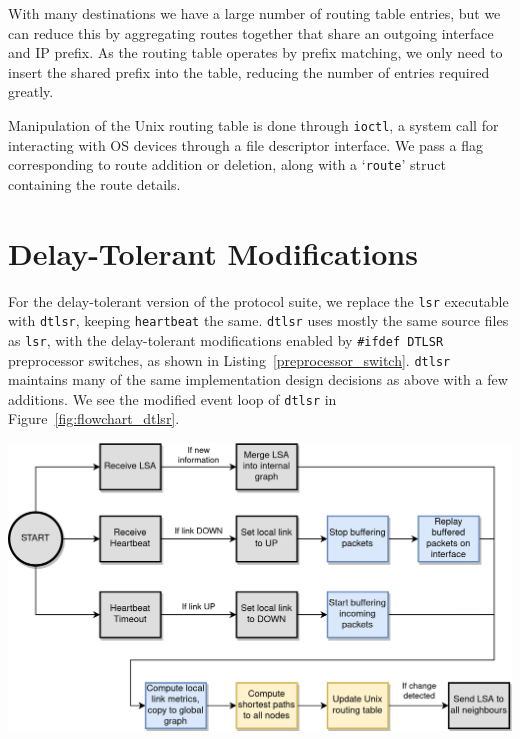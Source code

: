 \documentclass[withindex,glossary,openany]{cam-thesis}
\begin{document}
With many destinations we have a large number of routing table entries, but we can reduce this by aggregating routes together that share an outgoing interface and IP prefix. As the routing table operates by prefix matching, we only need to insert the shared prefix into the table, reducing the number of entries required greatly.

Manipulation of the Unix routing table is done through \texttt{ioctl}, a system call for interacting with OS devices through a file descriptor interface. We pass a flag corresponding to route addition or deletion, along with a `\texttt{route}' struct containing the route details.

\section{Delay-Tolerant Modifications}

For the delay-tolerant version of the protocol suite, we replace the \texttt{lsr} executable with \texttt{dtlsr}, keeping \texttt{heartbeat} the same. \texttt{dtlsr} uses mostly the same source files as \texttt{lsr}, with the delay-tolerant modifications enabled by \texttt{\#ifdef DTLSR} preprocessor switches, as shown in Listing~\ref{preprocessor_switch}. \texttt{dtlsr} maintains many of the same implementation design decisions as above with a few additions. We see the modified event loop of \texttt{dtlsr} in Figure~\ref{fig:flowchart_dtlsr}.

\begin{center}
\begin{minipage}{0.9\textwidth} \centering
	\includegraphics[width=1\textwidth]{flowchart_dtlsr}
	\label{fig:flowchart_dtlsr}
\end{minipage}
\end{center}
\end{document}
